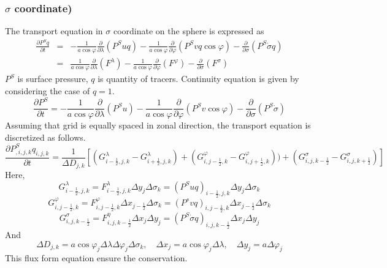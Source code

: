  \subsubsection{$\sigma$ coordinate)}
The transport equation in $\sigma$ coordinate on the sphere is expressed as
\begin{eqnarray}
  \label{b1}
  \frac{\partial P^{S} q}{\partial t} &=& - \frac{1}{a \cos \varphi} \frac{\partial}{\partial \lambda}(P^{S} uq)- \frac{1}{a \cos \varphi} \frac{\partial}{\partial \varphi}(P^{S} vq \cos \varphi)- \frac{\partial}{\partial \sigma} (P^{S} \dot{\sigma} q)\\
  &=& \frac{1}{a \cos \varphi} \frac{\partial}{\partial \lambda}(F^{\lambda})- \frac{1}{a \cos \varphi} \frac{\partial}{\partial \varphi}(F^{\varphi})- \frac{\partial}{\partial \sigma} (F^{\sigma})
\end{eqnarray}
$P^{S}$ is surface pressure, $q$ is quantity of tracers.
Continuity equation is given by considering the case of $q=1$.
\begin{equation}
  \frac{\partial P^{S}}{\partial t} = - \frac{1}{a \cos \varphi} \frac{\partial}{\partial \lambda}(P^{S}u)- \frac{1}{a \cos \varphi} \frac{\partial}{\partial \varphi}(P^{S}v \cos \varphi)- \frac{\partial}{\partial \sigma} (P^{S} \dot{\sigma})
\end{equation}
Assuming that grid is equally spaced in zonal direction, the transport equation is discretized as follows.
\begin{equation}
\label{a1}
  \frac{\partial P^{S}_{,i,j,k} q_{i,j,k}}{\partial t}=\frac{1}{\Delta D_{j,k}}[(G^{\lambda}_{i-\frac{1}{2},j,k}-G^{\lambda}_{i+\frac{1}{2},j,k})+(G^{\varphi}_{i,j-\frac{1}{2},k}-G^{\varphi}_{i,j+\frac{1}{2},k}))+(G^{\sigma}_{i,j,k-\frac{1}{2}}-G^{\sigma}_{i,j,k+\frac{1}{2}})]
\end{equation}
Here,
\begin{equation}
  G^{\lambda}_{i-\frac{1}{2},j,k}=F^{\lambda}_{i-\frac{1}{2},j,k} \Delta y_{j} \Delta \sigma_{k}=(P^{S}uq)_{i-\frac{1}{2},j,k} \Delta y_{j} \Delta \sigma_{k}
\end{equation}
\begin{equation}
  G^{\varphi}_{i,j-\frac{1}{2},k}=F^{\varphi}_{i,j-\frac{1}{2},k} \Delta x_{j-\frac{1}{2}} \Delta \sigma_{k}=(P^{s}vq)_{i,j-\frac{1}{2},k} \Delta x_{j-\frac{1}{2}} \Delta \sigma_{k}
\end{equation}
\begin{equation}
  G^{\sigma}_{i,j,k-\frac{1}{2}}=F^{\eta}_{i,j,k-\frac{1}{2}} \Delta x_{j} \Delta y_{j}=(P^{S} \dot{\sigma} q)_{i,j,k-\frac{1}{2}} \Delta x_{j} \Delta y_{j}
\end{equation}
And
\begin{equation}
  \Delta D_{j,k}=a \cos \varphi_{j} \Delta \lambda \Delta \varphi_{j} \Delta \sigma_{k},\quad \Delta x_{j}=a \cos \varphi_{j} \Delta \lambda,\quad \Delta y_{j}=a \Delta \varphi_{j}
\end{equation}
This flux form equation ensure the conservation.

